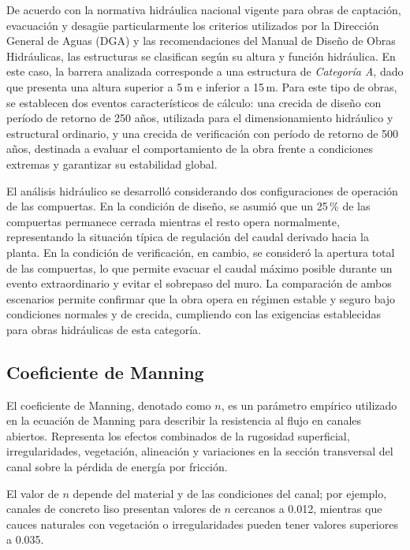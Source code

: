 \documentclass{article} %
\begin{document}
De acuerdo con la normativa hidráulica nacional vigente para obras de captación, evacuación y desagüe particularmente los criterios utilizados por la Dirección General de Aguas (DGA) y las recomendaciones del Manual de Diseño de Obras Hidráulicas, las estructuras se clasifican según su altura y función hidráulica. En este caso, la barrera analizada corresponde a una estructura de \textit{Categoría A}, dado que presenta una altura superior a 5\,m e inferior a 15\,m. Para este tipo de obras, se establecen dos eventos característicos de cálculo: una crecida de diseño con período de retorno de 250 años, utilizada para el dimensionamiento hidráulico y estructural ordinario, y una crecida de verificación con período de retorno de 500 años, destinada a evaluar el comportamiento de la obra frente a condiciones extremas y garantizar su estabilidad global.

El análisis hidráulico se desarrolló considerando dos configuraciones de operación de las compuertas. En la condición de diseño, se asumió que un 25\,\% de las compuertas permanece cerrada mientras el resto opera normalmente, representando la situación típica de regulación del caudal derivado hacia la planta. En la condición de verificación, en cambio, se consideró la apertura total de las compuertas, lo que permite evacuar el caudal máximo posible durante un evento extraordinario y evitar el sobrepaso del muro. La comparación de ambos escenarios permite confirmar que la obra opera en régimen estable y seguro bajo condiciones normales y de crecida, cumpliendo con las exigencias establecidas para obras hidráulicas de esta categoría.

\subsection{Coeficiente de Manning}

El coeficiente de Manning, denotado como $n$, es un parámetro empírico utilizado en la ecuación de Manning para describir la resistencia al flujo en canales abiertos. Representa los efectos combinados de la rugosidad superficial, irregularidades, vegetación, alineación y variaciones en la sección transversal del canal sobre la pérdida de energía por fricción.

El valor de $n$ depende del material y de las condiciones del canal; por ejemplo, canales de concreto liso presentan valores de $n$ cercanos a 0.012, mientras que cauces naturales con vegetación o irregularidades pueden tener valores superiores a 0.035.
\end{document}
